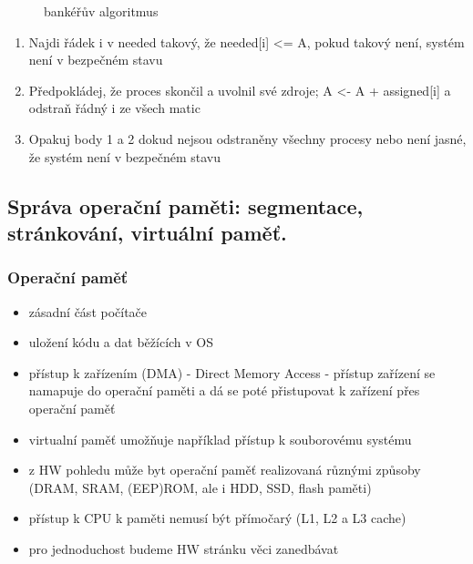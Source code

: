 \documentclass[10pt,a4paper]{article}
\begin{document}
\begin{itemize}
\begin{itemize}
\begin{itemize}
\begin{figure} [h]
			\caption{bankéřův algoritmus}
			\end{figure}
			\begin{enumerate}
				\item Najdi řádek i v needed takový, že needed[i] <= A, pokud takový není, systém není v bezpečném stavu
				\item Předpokládej, že proces skončil a uvolnil své zdroje; A <- A + assigned[i] a odstraň řádný i ze všech matic
				\item Opakuj body 1 a 2 dokud nejsou odstraněny všechny procesy nebo není jasné, že systém není v bezpečném stavu
			\end{enumerate}
		\end{itemize}
	\end{itemize}
\end{itemize}


\subsection{ Správa operační paměti: segmentace, stránkování, virtuální paměť.}

\subsubsection{Operační paměť}
\begin{itemize}
	\item zásadní část počítače
	\item uložení kódu a dat běžících v OS
	\item přístup k zařízením (DMA) - Direct Memory Access - přístup zařízení se namapuje do
operační paměti a dá se poté přistupovat k zařízení přes operační paměť
	\item virtualní paměť umožňuje například přístup k souborovému systému
	\item z HW pohledu může byt operační paměť realizovaná různými způsoby (DRAM, SRAM,
(EEP)ROM, ale i HDD, SSD, flash paměti)
	\item přístup k CPU k paměti nemusí být přímočarý (L1, L2 a L3 cache)
	\item pro jednoduchost budeme HW stránku věci zanedbávat
\end{itemize}
\end{document}
